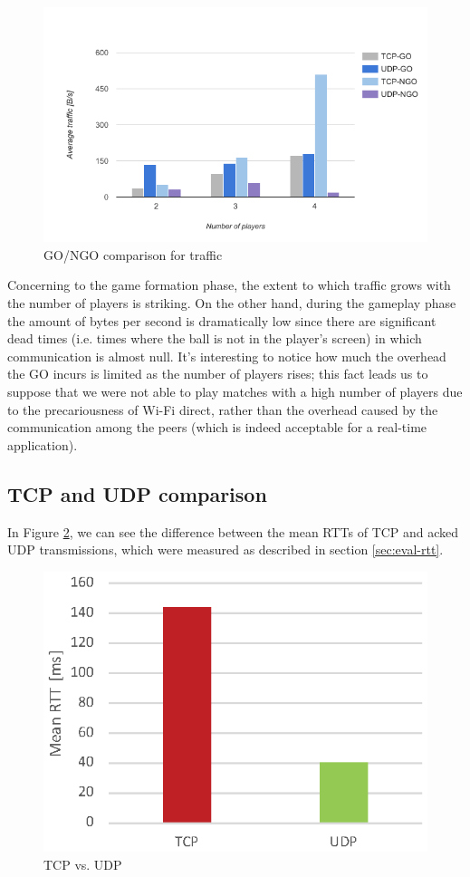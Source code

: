 \begin{figure}[H]
\includegraphics[width=\columnwidth]{img/traffic.png}

\caption{GO/NGO comparison for traffic}\label{fig:traffic}
\end{figure}


Concerning to the game formation phase, the extent to which traffic grows with
the number of players is striking. On the other hand, during the gameplay phase
the amount of bytes per second is dramatically low since there are significant
dead times (i.e. times where the ball is not in the player's screen) in which
communication is almost null.
It's interesting to notice how much the overhead the GO incurs is limited as
the number of players rises; this fact leads us to suppose that we were not
able to play matches with a high number of players due to the precariousness
of Wi-Fi direct, rather than the overhead caused by the communication among the
peers (which is indeed acceptable for a real-time application).

\subsection{TCP and UDP comparison}

In Figure \ref{fig:TCP-UDP}, we can see the difference between the mean RTTs of
TCP and acked UDP transmissions, which were measured as described in section
\ref{sec:eval-rtt}.

\begin{figure}[H]
  \centering
  \includegraphics[width=.8\columnwidth]{img/UDPvsTCP-RTT.eps}
  \caption{TCP vs. UDP}
  \label{fig:TCP-UDP}
\end{figure}

